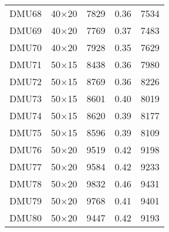 \begin{table}[H]
\begin{tabular}{@{}ccccc@{}}
DMU68 & 40$\times$20 & 7829 & 0.36 & 7534\\ 
DMU69 & 40$\times$20 & 7769 & 0.37 & 7483\\ 
DMU70 & 40$\times$20 & 7928 & 0.35 & 7629\\ 
DMU71 & 50$\times$15 & 8438 & 0.36 & 7980\\ 
DMU72 & 50$\times$15 & 8769 & 0.36 & 8226\\ 
DMU73 & 50$\times$15 & 8601 & 0.40 & 8019\\ 
DMU74 & 50$\times$15 & 8620 & 0.39 & 8177\\ 
DMU75 & 50$\times$15 & 8596 & 0.39 & 8109\\ 
DMU76 & 50$\times$20 & 9519 & 0.42 & 9198\\ 
DMU77 & 50$\times$20 & 9584 & 0.42 & 9233\\ 
DMU78 & 50$\times$20 & 9832 & 0.46 & 9431\\ 
DMU79 & 50$\times$20 & 9768 & 0.41 & 9401\\ 
DMU80 & 50$\times$20 & 9447 & 0.42 & 9193\\ \bottomrule
\end{tabular}
\end{table}
